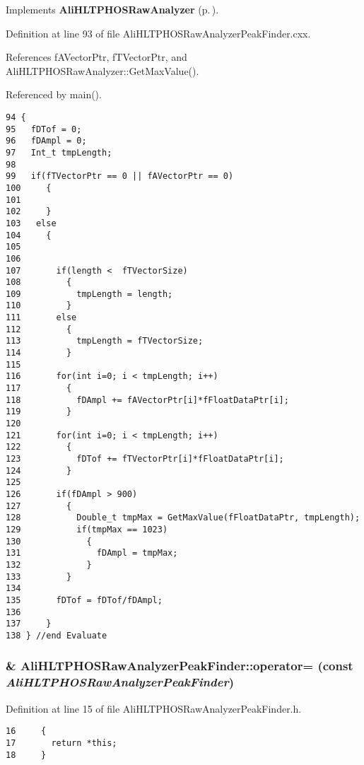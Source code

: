 Implements {\bf Ali\-HLTPHOSRaw\-Analyzer} {\rm (p.\,\pageref{classAliHLTPHOSRawAnalyzer_a17})}.

Definition at line 93 of file Ali\-HLTPHOSRaw\-Analyzer\-Peak\-Finder.cxx.

References f\-AVector\-Ptr, f\-TVector\-Ptr, and Ali\-HLTPHOSRaw\-Analyzer::Get\-Max\-Value().

Referenced by main().

\footnotesize\begin{verbatim}94 {
95   fDTof = 0;
96   fDAmpl = 0;
97   Int_t tmpLength;
98 
99   if(fTVectorPtr == 0 || fAVectorPtr == 0)
100     {
101 
102     }
103   else
104     {
105  
106      
107       if(length <  fTVectorSize)
108         {
109           tmpLength = length;
110         }
111       else
112         {
113           tmpLength = fTVectorSize;
114         }
115       
116       for(int i=0; i < tmpLength; i++)
117         {  
118           fDAmpl += fAVectorPtr[i]*fFloatDataPtr[i];    
119         }
120 
121       for(int i=0; i < tmpLength; i++)
122         {   
123           fDTof += fTVectorPtr[i]*fFloatDataPtr[i]; 
124         }
125       
126       if(fDAmpl > 900)
127         {
128           Double_t tmpMax = GetMaxValue(fFloatDataPtr, tmpLength);
129           if(tmpMax == 1023)
130             {
131               fDAmpl = tmpMax;
132             }
133         }
134 
135       fDTof = fDTof/fDAmpl;
136 
137     }
138 } //end Evaluate
\end{verbatim}\normalsize 


\subsubsection{\& Ali\-HLTPHOSRaw\-Analyzer\-Peak\-Finder::operator= (const  {\em Ali\-HLTPHOSRaw\-Analyzer\-Peak\-Finder})\hspace{0.3cm}{\tt  [inline]}}\label{classAliHLTPHOSRawAnalyzerPeakFinder_a2}




Definition at line 15 of file Ali\-HLTPHOSRaw\-Analyzer\-Peak\-Finder.h.

\footnotesize\begin{verbatim}16     {
17       return *this; 
18     }
\end{verbatim}\normalsize 


